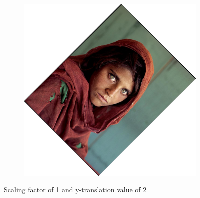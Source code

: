 \documentclass{article}
\begin{document}
\begin{figure}[H]
\begin{subfigure}{.3\textwidth}
    \end{subfigure}
    \begin{subfigure}{.3\textwidth}
        \centering
        \includegraphics[scale=0.04]{q1/output/similar_1_2_2.jpg}
    \end{subfigure}
    \caption{Scaling factor of 1 and y-translation value of 2}
\end{figure}
\end{document}
